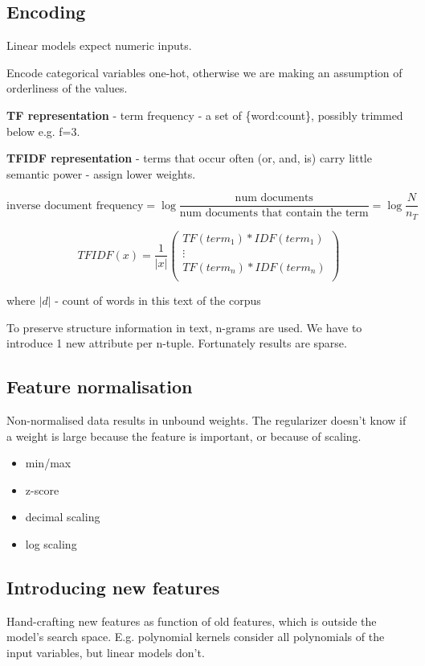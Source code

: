 \documentclass{article}
\newcommand{\para}[0]{\par\vspace{0.2cm}\noindent}
\newcommand{\define}[2]{\textbf{#1} - {#2}.  \para}
\begin{document}
\subsection{Encoding}
Linear models expect numeric inputs.
\para
Encode categorical variables one-hot, otherwise we are making an assumption of orderliness of the values.
\para
\define{TF representation}
           {term frequency - a set of \{word:count\},
            possibly trimmed below e.g. f=3}
\define{TFIDF representation}
           {terms that occur often (or, and, is) carry little semantic power - assign lower weights}
            $$\text{inverse document frequency}
                = \log \frac{\text{num documents}}{\text{num documents that contain the term}}
                = \log \frac{N}{n_T}$$

$$
TFIDF(x) = \frac{1}{|x|}
 \begin{pmatrix}
  TF({term}_1) * IDF({term}_1)  \\
  \vdots  \\
  TF({term}_n) * IDF({term}_n)  \\
 \end{pmatrix}
$$

where $|d|$ - count of words in this text of the corpus
\para
To preserve structure information in text, n-grams are used.
We have to introduce 1 new attribute per n-tuple.
Fortunately results are sparse.


\subsection{Feature normalisation}
Non-normalised data results in unbound weights.
The regularizer doesn't know if a weight is large because the feature is important, or because of scaling.
\begin{itemize}
    \item{min/max}
    \item{z-score}
    \item{decimal scaling}
    \item{log scaling}
\end{itemize}


\subsection{Introducing new features}
Hand-crafting new features as function of old features, which is outside the model's search space.
E.g. polynomial kernels consider all polynomials of the input variables, but linear models don't.
\end{document}
